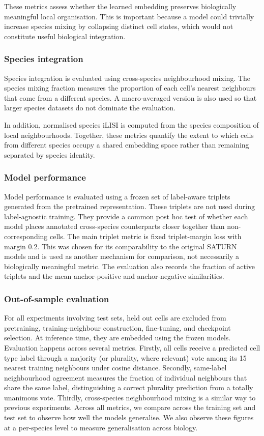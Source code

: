 \documentclass{article}
\begin{document}
These metrics assess whether the learned embedding preserves biologically meaningful local organisation. This is important because a model could trivially increase species mixing by collapsing distinct cell states, which would not constitute useful biological integration.
\subsubsection{Species integration}
Species integration is evaluated using cross-species neighbourhood mixing. The species mixing fraction measures the proportion of each cell’s nearest neighbours that come from a different species. A macro-averaged version is also used so that larger species datasets do not dominate the evaluation.

In addition, normalised species iLISI is computed from the species composition of local neighbourhoods. Together, these metrics quantify the extent to which cells from different species occupy a shared embedding space rather than remaining separated by species identity.
\subsubsection{Model performance}
Model performance is evaluated using a frozen set of label-aware triplets generated from the pretrained representation. These triplets are not used during label-agnostic training. They provide a common post hoc test of whether each model places annotated cross-species counterparts closer together than non-corresponding cells.
The main triplet metric is fixed triplet-margin loss with margin 0.2. This was chosen for its comparability to the original SATURN models and is used as another mechanism for comparison, not necessarily a biologically meaningful metric. The evaluation also records the fraction of active triplets and the mean anchor-positive and anchor-negative similarities. 
\subsubsection{Out-of-sample evaluation}
For all experiments involving test sets, held out cells are excluded from pretraining, training-neighbour construction, fine-tuning, and checkpoint selection. At inference time, they are embedded using the frozen models. Evaluation happens across several metrics. Firstly, all cells receive a predicted cell type label through a majority (or plurality, where relevant) vote among its 15 nearest training neighbours under cosine distance. Secondly, same-label neighbourhood agreement measures the fraction of individual neighbours that share the same label, distinguishing a correct plurality prediction from a totally unanimous vote. Thirdly, cross-species neighbourhood mixing is a similar way to previous experiments. Across all metrics, we compare across the training set and  test set to observe how well the models generalise. We also observe these figures at a per-species level to measure generalisation across biology.
\end{document}
